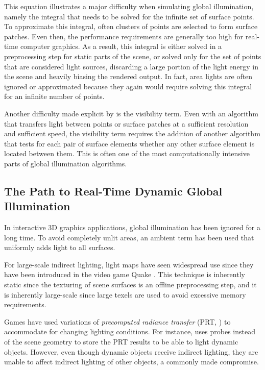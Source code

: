 This equation illustrates a major difficulty when simulating global illumination, namely the integral that needs to be solved for the infinite set of surface points. To approximate this integral, often clusters of points are selected to form surface patches. Even then, the performance requirements are generally too high for real-time computer graphics. As a result, this integral is either solved in a preprocessing step for static parts of the scene, or solved only for the set of points that are considered light sources, discarding a large portion of the light energy in the scene and heavily biasing the rendered output. In fact, area lights are often ignored or approximated because they again would require solving this integral for an infinite number of points.

Another difficulty made explicit by  is the visibility term. Even with an algorithm that transfers light between points or surface patches at a sufficient resolution and sufficient speed, the visibility term requires the addition of another algorithm that tests for each pair of surface elements whether any other surface element is located between them. This is often one of the most computationally intensive parts of global illumination algorithms.



\subsection{The Path to Real-Time Dynamic Global Illumination}

In interactive 3D graphics applications, global illumination has been ignored for a long time. To avoid completely unlit areas, an ambient term has been used that uniformly adds light to all surfaces.

For large-scale indirect lighting, light maps have seen widespread use since they have been introduced in the video game Quake \citep{Abrash:1997:BlackBook}. This technique is inherently static since the texturing of scene surfaces is an offline preprocessing step, and it is inherently large-scale since large texels are used to avoid excessive memory requirements.

Games have used variations of \emph{precomputed radiance transfer} (PRT, \cite{sloan:2002:PRT}) to accommodate for changing lighting conditions. For instance, \citet{stefanov:2012:PRTinFarCry3} uses probes instead of the scene geometry to store the PRT results to be able to light dynamic objects. However, even though dynamic objects receive indirect lighting, they are unable to affect indirect lighting of other objects, a commonly made compromise.

